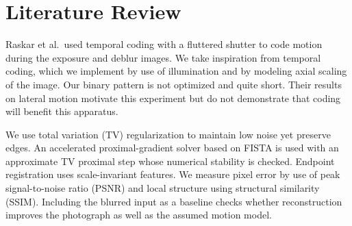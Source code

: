 \section{Literature Review}
Raskar et al.\ used temporal coding with a fluttered shutter to code motion during the exposure and deblur images\cite{raskar}. We take inspiration from temporal coding, which we implement by use of illumination and by modeling axial scaling of the image. Our binary pattern is not optimized and quite short. Their results on lateral motion motivate this experiment but do not demonstrate that coding will benefit this apparatus.

We use total variation (TV) regularization to maintain low noise yet preserve edges\cite{rof}. An accelerated proximal-gradient solver based on FISTA\cite{fista} is used with an approximate TV proximal step whose numerical stability is checked. Endpoint registration uses scale-invariant features\cite{lowe}. We measure pixel error by use of peak signal-to-noise ratio (PSNR) and local structure using structural similarity (SSIM)\cite{ssim}. Including the blurred input as a baseline checks whether reconstruction improves the photograph as well as the assumed motion model.
